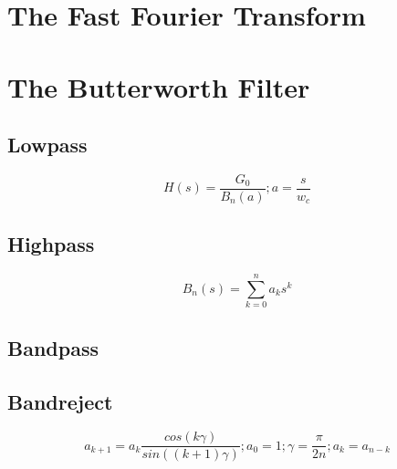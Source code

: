 \documentclass[twoside]{article}
\begin{document}
\section{The Fast Fourier Transform} \label{FFT}

\section{The Butterworth Filter} \label{Butterworth}
\subsection{Lowpass} \label{Butterworth:Lowpass}
\begin{equation} \label{butterworth:lowpass_generic}
    H(s) = \frac{G_{0}}{B_{n}(a)}; a = \frac{s}{w_{c}}
\end{equation}

\subsection{Highpass} \label{Butterworth:Highpass}
\begin{equation} \label{butterworth:polynomial}
    B_{n}(s) = \sum_{k = 0}^{n} a_{k}s^{k}
\end{equation}

\subsection{Bandpass} \label{Butterworth:Bandpass}
\subsection{Bandreject} \label{Butterworth:Bandreject}
\begin{equation} \label{butterowrth:coefficients}
    a_{k + 1} = a_{k}\frac{cos\left(k\gamma\right)}{sin((k + 1)\gamma)}; a_{0} = 1; \gamma = \frac{\pi}{2n}; a_{k} = a_{n - k}
\end{equation}
\end{document}
